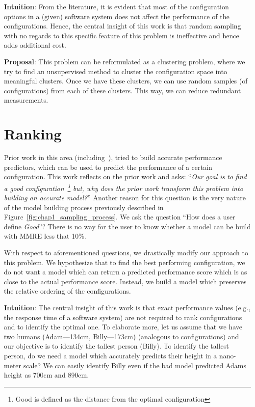 \noindent\textbf{Intuition}: From the literature, it is evident that most of the configuration options in a (given) software system does not affect the performance of the configurations. Hence, the central insight of this work is that random sampling with no regards to this specific feature of this problem is ineffective and hence adds additional cost. 

\noindent\textbf{Proposal}: This problem can be reformulated as a clustering problem, where we try to find an unsupervised method to cluster the configuration space into meaningful clusters. Once we have these clusters, we can use random samples (of configurations) from each of these clusters. This way, we can reduce redundant measurements.  

\section{Ranking}
Prior work in this area (including~\cite{nair2017faster}), tried to build accurate performance predictors, which can be used to predict the performance of a certain configuration. This work reflects on the prior work and asks: ``\textit{Our goal is to find a good configuration~\footnote{Good is defined as the distance from the optimal configuration} but, why does the prior work transform this problem into building an accurate model?}'' Another reason for this question is the very nature of the model building process previously described in Figure~\ref{fig:chap1_sampling_process}. We ask the question ``How does a user define \textit{Good}''? There is no way for the user to know whether a model can be build with MMRE less that 10\%. 

With respect to aforementioned questions, we drastically modify our approach to this problem. We hypothesize that to find the best performing configuration, we do not want a model which can return a predicted performance score which is as close to the actual performance score. Instead, we build a model which preserves the relative ordering of the configurations. 

\noindent\textbf{Intuition}: The central insight of this work is that exact performance
values (e.g., the response time of a software system) are not
required to rank configurations and to identify the optimal one. To elaborate more, let us assume that we have two humans (Adam---134cm, Billy---173cm) (analogous to configurations) and our objective is to identify the tallest person (Billy). To identify the tallest person, do we need a model which accurately predicts their height in a nano-meter scale? We can easily identify Billy even if the bad model predicted Adams height as 700cm and 890cm. 

